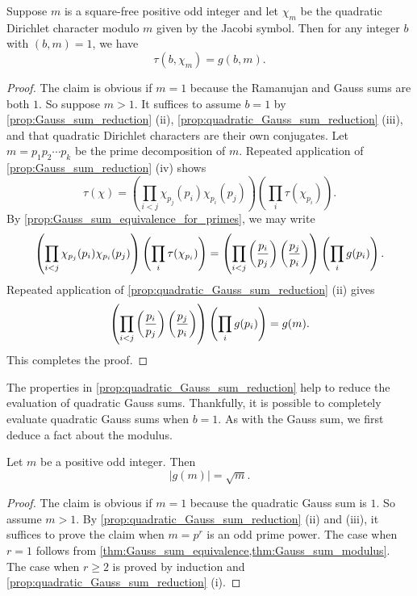     \begin{theorem}\label{thm:Gauss_sum_equivalence}
      Suppose \(m\) is a square-free positive odd integer and let \(\chi_{m}\) be the quadratic Dirichlet character modulo \(m\) given by the Jacobi symbol. Then for any integer \(b\) with \((b,m) = 1\), we have
      \[
        \tau(b,\chi_{m}) = g(b,m).
      \]
    \end{theorem}
    \begin{proof}
      The claim is obvious if \(m = 1\) because the Ramanujan and Gauss sums are both \(1\). So suppose \(m > 1\). It suffices to assume \(b = 1\) by \cref{prop:Gauss_sum_reduction} (ii), \cref{prop:quadratic_Gauss_sum_reduction} (iii), and that quadratic Dirichlet characters are their own conjugates. Let \(m = p_{1}p_{2} \cdots p_{k}\) be the prime decomposition of \(m\). Repeated application of \cref{prop:Gauss_sum_reduction} (iv) shows
      \[
        \tau(\chi) = \left(\prod_{i < j}\chi_{p_{j}}(p_{i})\chi_{p_{i}}(p_{j})\right)\left(\prod_{i}\tau(\chi_{p_{i}})\right).
      \]
      By \cref{prop:Gauss_sum_equivalence_for_primes}, we may write
      \[
        \left(\prod_{i < j}\chi_{p_{j}}(p_{i})\chi_{p_{i}}(p_{j})\right)\left(\prod_{i}\tau(\chi_{p_{i}})\right) = \left(\prod_{i < j}\left(\frac{p_{i}}{p_{j}}\right)\left(\frac{p_{j}}{p_{i}}\right)\right)\left(\prod_{i}g(p_{i})\right).
      \]
      Repeated application of \cref{prop:quadratic_Gauss_sum_reduction} (ii) gives
      \[
        \left(\prod_{i < j}\left(\frac{p_{i}}{p_{j}}\right)\left(\frac{p_{j}}{p_{i}}\right)\right)\left(\prod_{i}g(p_{i})\right) = g(m).
      \]
      This completes the proof.
    \end{proof}

    The properties in \cref{prop:quadratic_Gauss_sum_reduction} help to reduce the evaluation of quadratic Gauss sums. Thankfully, it is possible to completely evaluate quadratic Gauss sums when \(b = 1\). As with the Gauss sum, we first deduce a fact about the modulus.

    \begin{theorem}\label{thm:quadratic_Gauss_sum_modulus}
      Let \(m\) be a positive odd integer. Then
      \[
        |g(m)| = \sqrt{m}.
      \]
    \end{theorem}
    \begin{proof}
      The claim is obvious if \(m = 1\) because the quadratic Gauss sum is \(1\). So assume \(m > 1\). By \cref{prop:quadratic_Gauss_sum_reduction} (ii) and (iii), it suffices to prove the claim when \(m = p^{r}\) is an odd prime power. The case when \(r = 1\) follows from \cref{thm:Gauss_sum_equivalence,thm:Gauss_sum_modulus}. The case when \(r \ge 2\) is proved by induction and \cref{prop:quadratic_Gauss_sum_reduction} (i).
    \end{proof}

